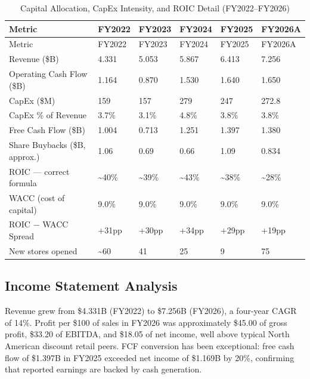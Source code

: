 \documentclass[11pt]{article}
\begin{document}
\begingroup
\small
\setlength{\tabcolsep}{4pt}
\setlength{\LTleft}{0pt}
\setlength{\LTright}{0pt}
\begin{longtable}{P{4.0cm} C{2.0cm} C{2.0cm} C{2.0cm} C{2.0cm} C{2.0cm}}
\caption{Capital Allocation, CapEx Intensity, and ROIC Detail (FY2022--FY2026)}\\
\toprule
{}
Metric & FY2022 & FY2023 & FY2024 & FY2025 & FY2026A \\
\midrule
\endfirsthead
\toprule
{}
Metric & FY2022 & FY2023 & FY2024 & FY2025 & FY2026A \\
\midrule
\endhead
Revenue (\$B) & 4.331 & 5.053 & 5.867 & 6.413 & 7.256 \\
Operating Cash Flow (\$B) & 1.164 & 0.870 & 1.530 & 1.640 & 1.650 \\
CapEx (\$M) & 159 & 157 & 279 & 247 & 272.8 \\
CapEx \% of Revenue & 3.7\% & 3.1\% & 4.8\% & 3.8\% & 3.8\% \\
Free Cash Flow (\$B) & 1.004 & 0.713 & 1.251 & 1.397 & 1.380 \\
Share Buybacks (\$B, approx.) & 1.06 & 0.69 & 0.66 & 1.09 & 0.834 \\
ROIC --- correct formula & \textasciitilde{}40\% & \textasciitilde{}39\% & \textasciitilde{}43\% & \textasciitilde{}38\% & \textasciitilde{}28\% \\
WACC (cost of capital) & 9.0\% & 9.0\% & 9.0\% & 9.0\% & 9.0\% \\
ROIC $-$ WACC Spread & +31pp & +30pp & +34pp & +29pp & +19pp \\
New stores opened & \textasciitilde{}60 & 41 & 25 & 9 & 75 \\
\bottomrule
\end{longtable}
\endgroup

\subsection{Income Statement Analysis}
Revenue grew from \$4.331B (FY2022) to \$7.256B (FY2026), a four-year CAGR of 14\%. Profit per \$100 of sales in FY2026 was approximately \$45.00 of gross profit, \$33.20 of EBITDA, and \$18.05 of net income, well above typical North American discount retail peers. FCF conversion has been exceptional: free cash flow of \$1.397B in FY2025 exceeded net income of \$1.169B by 20\%, confirming that reported earnings are backed by cash generation.
\end{document}
